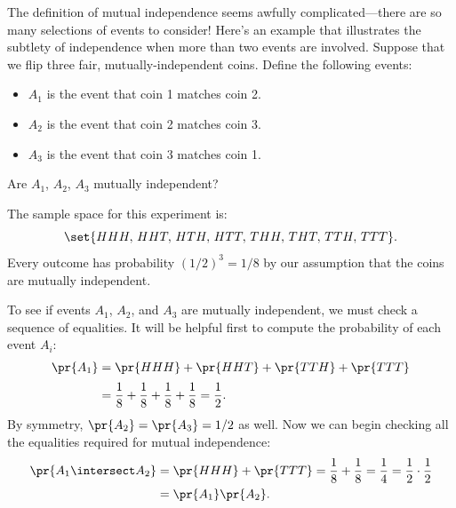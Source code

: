 The definition of mutual independence seems awfully
complicated---there are so many selections of events to consider!
Here's an example that illustrates the subtlety of independence when
more than two events are involved.  Suppose that we flip three fair,
mutually-independent coins.  Define the following events:
%
\begin{itemize}
\item $A_1$ is the event that coin 1 matches coin 2.
\item $A_2$ is the event that coin 2 matches coin 3.
\item $A_3$ is the event that coin 3 matches coin 1.
\end{itemize}
%
Are $A_1$, $A_2$, $A_3$ mutually independent?

The sample space for this experiment is:
%
\[
    \set{HHH,\, HHT,\, HTH,\, HTT,\, THH,\, THT,\, TTH,\, TTT}.
\]
%
Every outcome has probability $(1/2)^3 = 1/8$ by our assumption that
the coins are mutually independent.

To see if events $A_1$, $A_2$, and $A_3$ are mutually independent, we
must check a sequence of equalities.  It will be helpful first to
compute the probability of each event $A_i$:
%
\begin{align*}
\pr{A_1} & = \pr{HHH} + \pr{HHT} + \pr{TTH} + \pr{TTT} \\[2pt]
         & = \frac{1}{8} + \frac{1}{8} + \frac{1}{8} + \frac{1}{8}%
          = \frac{1}{2}.
\end{align*}
%
By symmetry, $\pr{A_2} = \pr{A_3} = 1/2$ as well.  Now we can begin
checking all the equalities required for mutual independence:
\begin{align*}
\pr{A_1 \intersect A_2}
       & = \pr{HHH} + \pr{TTT}
         = \frac{1}{8} + \frac{1}{8}
         = \frac{1}{4}
         = \frac{1}{2} \cdot \frac{1}{2}\\
       & = \pr{A_1} \pr{A_2}.
\end{align*}

